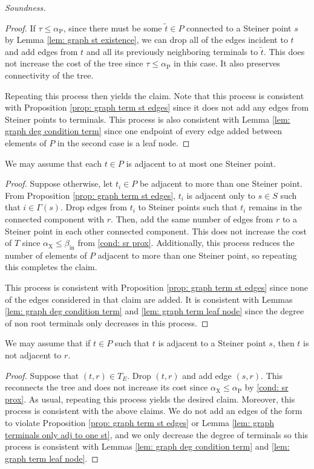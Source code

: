 \documentclass{theoretics}
\newcommand{\1}{\textbf{1}}
\newcommand{\td}{\tau}
\newcommand{\srd}{\alpha_{\text{X}}}
\newcommand{\trd}{\alpha_{\text{P}}}
\renewcommand{\tilde}{\widetilde}
\begin{document}
\begin{paragraph}{\textit{Soundness.}}
\begin{proof}
  If $\td \leq \trd$, since there must be some $\tilde{t} \in P$ connected to a Steiner point $s$ by Lemma \ref{lem: graph st existence}, we can drop all of the edges incident to $t$ and add edges from $t$ and all its previously neighboring terminals to $\tilde{t}$. 
  This does not increase the cost of the tree since $\td \leq \trd$ in this case. It also preserves connectivity of the tree.
  
  Repeating this process then yields the claim. Note that this process is consistent with Proposition \ref{prop: graph term st edges} since it does not add any edges from Steiner points to terminals. This process is also consistent with Lemma \ref{lem: graph deg condition term} since one endpoint of every edge added between elements of $P$ in the second case is a leaf node.
 \end{proof}
 

 \begin{lemma} \label{lem: graph terminals only adj to one st}
 We may assume that each $t \in P$ is adjacent to at most one Steiner point.
 \end{lemma}
 \begin{proof}
  Suppose otherwise, let $t_i \in P$ be adjacent to more than one Steiner point. From Proposition \ref{prop: graph term st edges}, $t_i$ is adjacent only to $s \in S$ such that $i \in \Gamma(s)$. Drop edges from $t_i$ to Steiner points such that $t_i$ remains in the connected component with $r$. Then, add the same number of edges from $r$ to a Steiner point in each other connected component. This does not increase the cost of $T$ since $\srd \leq \beta_{\text{in}}$ from \ref{cond: sr prox}. Additionally, this process reduces the number of elements of $P$ adjacent to more than one Steiner point, so repeating this completes the claim.
  
  This process is consistent with Proposition \ref{prop: graph term st edges} since none of the edges considered in that claim are added. It is consistent with Lemmas \ref{lem: graph deg condition term} and \ref{lem: graph term leaf node} since the degree of non root terminals only decreases in this process.
 \end{proof}
 
 
 \begin{proposition} \label{prop: graph terminals not adj to r if in triangle}
 We may assume that if $t \in P$ such that $t$ is adjacent to a Steiner point $s$, then $t$ is not adjacent to $r$.
 \end{proposition}
 \begin{proof}
 Suppose that $(t,r) \in T_E$. Drop $(t,r)$ and add edge $(s,r)$. This reconnects the tree and does not increase its cost since $\srd \leq \trd$ by \ref{cond: sr prox}. As usual, repeating this process yields the desired claim. Moreover, this process is consistent with the above claims. We do not add an edges of the form to violate Proposition \ref{prop: graph term st edges} or Lemma \ref{lem: graph terminals only adj to one st}, and we only decrease the degree of terminals so this process is consistent with Lemmas \ref{lem: graph deg condition term} and \ref{lem: graph term leaf node}.
 \end{proof}
 

\end{paragraph}
\end{document}
